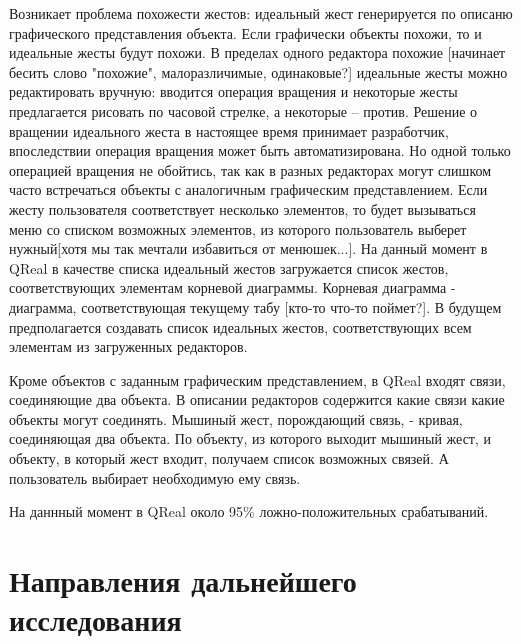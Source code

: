 \documentclass[a5paper]{article}
\begin{document}
Возникает проблема похожести жестов: идеальный жест генерируется по описаню графического представления объекта. Если графически объекты похожи, то и идеальные жесты будут похожи. В пределах одного редактора похожие [начинает бесить слово "похожие", малоразличимые, одинаковые?] идеальные жесты можно редактировать вручную: вводится операция вращения и некоторые жесты предлагается рисовать по часовой стрелке, а некоторые -- против. Решение о вращении идеального жеста в настоящее время принимает разработчик, впоследствии операция вращения может быть автоматизирована. Но одной только операцией вращения не обойтись, так как в разных редакторах могут слишком часто встречаться объекты с аналогичным графическим представлением. Если жесту пользователя соответствует несколько элементов, то будет вызываться меню со списком возможных элементов, из которого пользователь выберет нужный[хотя мы так мечтали избавиться от менюшек...]. На данный момент в QReal в качестве списка идеальный жестов загружается список жестов, соответствующих элементам корневой диаграммы. Корневая диаграмма - диаграмма, соответствующая текущему табу [кто-то что-то поймет?]. В будущем предполагается создавать список идеальных жестов, соответствующих всем элементам из загруженных редакторов.

Кроме объектов с заданным графическим представлением, в QReal входят связи, соединяющие два объекта. В описании редакторов содержится какие связи какие объекты могут соединять. Мышиный жест, порождающий связь, - кривая, соединяющая два объекта. По объекту, из которого выходит мышиный жест, и объекту, в который жест входит, получаем список возможных связей. А пользователь выбирает необходимую ему связь.

На даннный момент в QReal около 95\% ложно-положительных срабатываний.

\section{Направления дальнейшего исследования}
\end{document}
